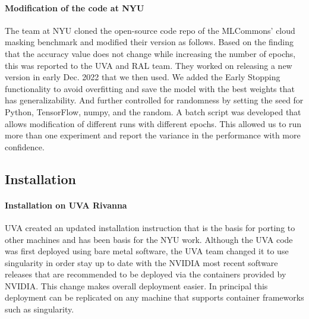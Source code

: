 \documentclass[sigplan,screen]{acmart}
\begin{document}
\paragraph{Modification of the code at NYU} The team at NYU cloned the open-source code \cite{www-mlcommons-science-github} repo of the MLCommons' cloud masking benchmark and modified their version as follows. 
Based on the finding that the accuracy value does not change while increasing the number of epochs, this was reported to the UVA and RAL team. They worked on releasing a new version in early Dec. 2022 that we then used. We added the Early Stopping \cite{Caruana2000OverfittingIN} functionality to avoid overfitting and save the model with the best weights that has generalizability. And further controlled for randomness by setting the seed for Python, TensorFlow, numpy, and the random. A batch script was developed that allows modification of different runs with different epochs. This allowed us to run more than one experiment and report the variance in the performance with more confidence.


\subsection{Installation}
\label{sec:install}

\paragraph{Installation on UVA Rivanna} UVA created an updated installation instruction that is the basis for porting to other machines and has been basis for the NYU work. Although the UVA code was first deployed using bare metal software, the UVA team changed it to use singularity in order stay up to date with the NVIDIA most recent software releases that are recommended to be deployed via the containers provided by NVIDIA. This change makes overall deployment easier. In principal this deployment can be replicated on any machine that supports container frameworks such as singularity.
\end{document}
